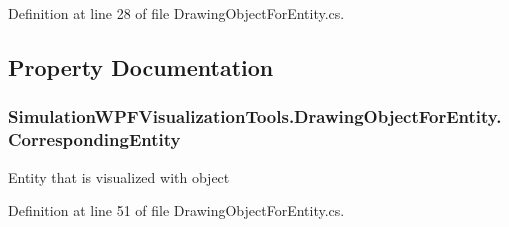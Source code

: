 Definition at line 28 of file Drawing\+Object\+For\+Entity.\+cs.



\subsection{Property Documentation}
\subsubsection[{\texorpdfstring{Corresponding\+Entity}{CorrespondingEntity}}]{ Simulation\+W\+P\+F\+Visualization\+Tools.\+Drawing\+Object\+For\+Entity.\+Corresponding\+Entity\hspace{0.3cm}{\ttfamily [get]}}\hypertarget{class_simulation_w_p_f_visualization_tools_1_1_drawing_object_for_entity_a00ac49fe30789caf239102c197f13e07}{}\label{class_simulation_w_p_f_visualization_tools_1_1_drawing_object_for_entity_a00ac49fe30789caf239102c197f13e07}


Entity that is visualized with object 



Definition at line 51 of file Drawing\+Object\+For\+Entity.\+cs.

